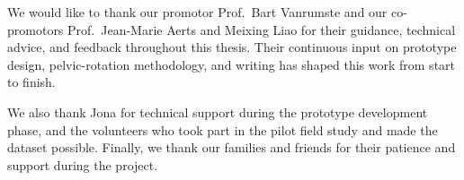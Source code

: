We would like to thank our promotor Prof.\ Bart Vanrumste and our co-promotors Prof.\ Jean-Marie Aerts and Meixing Liao for their guidance, technical advice, and feedback throughout this thesis. Their continuous input on prototype design, pelvic-rotation methodology, and writing has shaped this work from start to finish.

We also thank Jona for technical support during the prototype development phase, and the volunteers who took part in the pilot field study and made the dataset possible. Finally, we thank our families and friends for their patience and support during the project.
